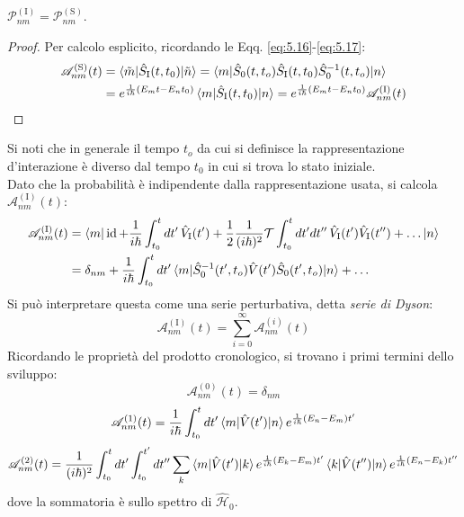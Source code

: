 \begin{proposition}
	$ \mathscr{P}^{(\text{I})}_{nm} = \mathscr{P}^{(\text{S})}_{nm} $.
\end{proposition}
\begin{proof}
	Per calcolo esplicito, ricordando le Eqq. \ref{eq:5.16}-\ref{eq:5.17}:
	\begin{equation*}
		\begin{split}
			\mathscr{A}^{(\text{S})}_{nm}(t)
			&= \braket{\tilde{m} | \hat{S}_{\text{I}}(t,t_0) | \tilde{n}} = \braket{m | \hat{S}_0(t,t_o) \hat{S}_{\text{I}}(t,t_0) \hat{S}^{-1}_0 (t,t_o) | n} \\
			&= e^{\frac{1}{i\hbar} \left( E_m t - E_n t_0 \right)} \braket{m | \hat{S}_{\text{I}}(t,t_0) | n} = e^{\frac{1}{i\hbar} \left( E_m t - E_n t_0 \right)} \mathscr{A}^{(\text{I})}_{nm}(t)
		\end{split}
	\end{equation*}
\end{proof}

Si noti che in generale il tempo $ t_o $ da cui si definisce la rappresentazione d'interazione è diverso dal tempo $ t_0 $ in cui si trova lo stato iniziale.\\
Dato che la probabilità è indipendente dalla rappresentazione usata, si calcola $ \mathscr{A}^{(\text{I})}_{nm}(t) $:
\begin{equation*}
	\begin{split}
		\mathscr{A}^{(\text{I})}_{nm}(t)
		&= \braket{m | \operatorname{id} + \frac{1}{i\hbar} \int_{t_0}^t dt'\, \hat{V}_{\text{I}}(t') + \frac{1}{2} \frac{1}{(i\hbar)^2} \mathcal{T} \int_{t_0}^t dt' dt''\, \hat{V}_{\text{I}}(t') \hat{V}_{\text{I}}(t'') + \dots | n} \\
		&= \delta_{nm} + \frac{1}{i\hbar} \int_{t_0}^t dt' \braket{m | \hat{S}^{-1}_0 (t',t_o) \hat{V}(t') \hat{S}_0 (t',t_o) | n} + \dots
	\end{split}
\end{equation*}
Si può interpretare questa come una serie perturbativa, detta \textit{serie di Dyson}:
\begin{equation}
	\mathscr{A}^{(\text{I})}_{nm}(t) = \sum_{i = 0}^{\infty} \mathscr{A}^{(i)}_{nm}(t)
	\label{eq:5.20}
\end{equation}
Ricordando le proprietà del prodotto cronologico, si trovano i primi termini dello sviluppo:
\begin{equation}
	\mathscr{A}^{(0)}_{nm}(t) = \delta_{nm}
	\label{eq:5.21}
\end{equation}
\begin{equation}
	\mathscr{A}^{(1)}_{nm}(t) = \frac{1}{i\hbar} \int_{t_0}^t dt' \braket{m | \hat{V}(t') | n} e^{\frac{1}{i\hbar} \left( E_n - E_m \right) t'}
	\label{eq:5.22}
\end{equation}
\begin{equation}
	\mathscr{A}^{(2)}_{nm}(t) = \frac{1}{(i\hbar)^2} \int_{t_0}^t dt' \int_{t_0}^{t'} dt'' \sum_{k} \braket{m | \hat{V}(t') | k} e^{\frac{1}{i\hbar} \left( E_k - E_m \right) t'} \braket{k | \hat{V}(t'') | n} e^{\frac{1}{i\hbar} \left( E_n - E_k \right) t''}
	\label{eq:5.23}
\end{equation}
dove la sommatoria è sullo spettro di $ \hat{\mathcal{H}}_0 $.

